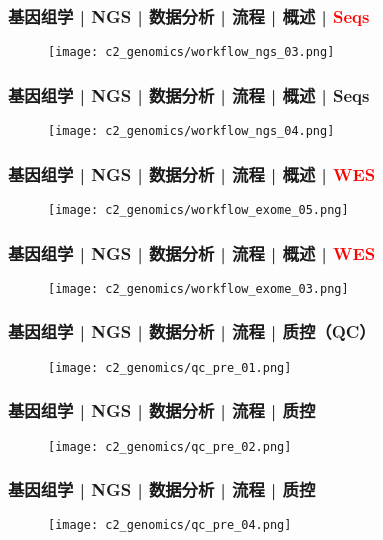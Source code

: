 \begin{frame}
  \frametitle{基因组学 | NGS | 数据分析 | 流程 | 概述 | \textcolor{red}{Seqs}}
  \begin{figure}
    \centering
    \texttt{[image: c2\_genomics/workflow\_ngs\_03.png]}
  \end{figure}
\end{frame}

\begin{frame}
  \frametitle{基因组学 | NGS | 数据分析 | 流程 | 概述 | Seqs}
  \begin{figure}
    \centering
    \texttt{[image: c2\_genomics/workflow\_ngs\_04.png]}
  \end{figure}
\end{frame}

\begin{frame}
  \frametitle{基因组学 | NGS | 数据分析 | 流程 | 概述 | \textcolor{red}{WES}}
  \begin{figure}
    \centering
    \texttt{[image: c2\_genomics/workflow\_exome\_05.png]}
  \end{figure}
\end{frame}

\begin{frame}
  \frametitle{基因组学 | NGS | 数据分析 | 流程 | 概述 | \textcolor{red}{WES}}
  \begin{figure}
    \centering
    \texttt{[image: c2\_genomics/workflow\_exome\_03.png]}
  \end{figure}
\end{frame}

\begin{frame}
  \frametitle{基因组学 | NGS | 数据分析 | 流程 | 质控（QC）}
  \begin{figure}
    \centering
    \texttt{[image: c2\_genomics/qc\_pre\_01.png]}
  \end{figure}
\end{frame}

\begin{frame}
  \frametitle{基因组学 | NGS | 数据分析 | 流程 | 质控}
  \begin{figure}
    \centering
    \texttt{[image: c2\_genomics/qc\_pre\_02.png]}
  \end{figure}
\end{frame}

\begin{frame}
  \frametitle{基因组学 | NGS | 数据分析 | 流程 | 质控}
  \begin{figure}
    \centering
    \texttt{[image: c2\_genomics/qc\_pre\_04.png]}
  \end{figure}
\end{frame}

